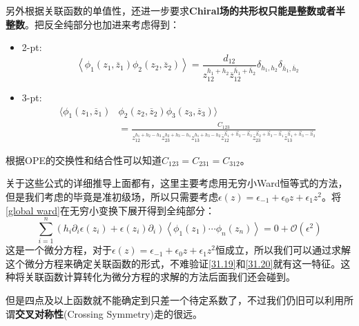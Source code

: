 另外根据关联函数的单值性，还进一步要求\textbf{Chiral场的共形权只能是整数或者半整数}。把反全纯部分也加进来考虑得到：
\begin{itemize}
	\item 2-pt:
	\begin{equation}
		\left\langle\phi_1(z_1,\overline{z}_1)\phi_2(z_2,\overline{z}_2)\right\rangle=\frac{d_{12}}{z_{12}^{h_1+h_2}\overline{z}_{12}^{\overline{h}_1+\overline{h}_2}}\delta_{h_1,h_2}\delta_{\overline{h}_1,\overline{h}_2}
	\end{equation}
	\item 3-pt:
	\begin{equation}
		\begin{aligned}\big\langle\phi_1(z_1,\overline{z}_1)&\phi_2(z_2,\overline{z}_2)\phi_3(z_3,\overline{z}_3)\big\rangle\\&=\frac{C_{123}}{z_{12}^{h_1+h_2-h_3}z_{23}^{h_2+h_3-h_1}z_{13}^{h_1+h_3-h_2}\overline{z}_{12}^{\vec{h}_1+\vec{h}_2-\vec{h}_3}\overline{z}_{23}^{\vec{h}_2+\vec{h}_3-\vec{h}_1}\overline{z}_{13}^{\vec{h}_1+\vec{h}_3-\vec{h}_2} }\end{aligned}
	\end{equation}
\end{itemize}
根据OPE的交换性和结合性可以知道$C_{123}=C_{231}=C_{312}$。

关于这些公式的详细推导\cite{ito}上面都有，这里主要考虑用无穷小Ward恒等式的方法，但是我们考虑的毕竟是准初级场，所以只需要考虑$\epsilon(z)=\epsilon_{-1}+\epsilon_0z+\epsilon_1z^2$。将\ref{global ward}在无穷小变换下展开得到全纯部分：
\begin{equation}
	\displaystyle\sum_{i=1}^{n}\left(h_{i}\partial_{i}\epsilon\left(z_{i}\right)+\epsilon\left(z_{i}\right)\partial_{i}\right)\left<\phi_{1}\left(z_{1}\right)\cdots\phi_{n}\left(z_{n}\right)\right>=0+\mathcal{O}(\epsilon^2)
\end{equation}
这是一个微分方程，对于$\epsilon(z)=\epsilon_{-1}+\epsilon_0z+\epsilon_1z^2$恒成立，所以我们可以通过求解这个微分方程来确定关联函数的形式，不难验证\ref{31.19}和\ref{31.20}就有这一特征。这种将关联函数计算转化为微分方程的求解的方法后面我们还会碰到。

但是四点及以上函数就不能确定到只差一个待定系数了，不过我们仍旧可以利用所谓\textbf{交叉对称性}(Crossing Symmetry)走的很远。

